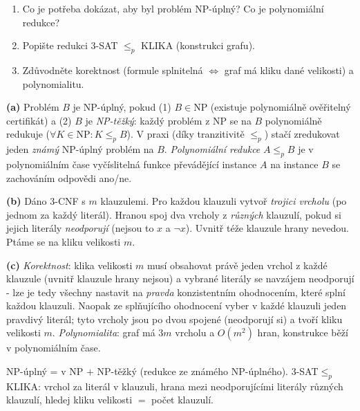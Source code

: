 \begin{zadani}
\begin{enumerate}[label=(\alph*)]
  \item {} Co je potřeba dokázat, aby byl problém NP-úplný? Co je polynomiální redukce?
  \item {} Popište redukci 3-SAT $\le_p$ KLIKA (konstrukci grafu).
  \item {} Zdůvodněte korektnost (formule splnitelná $\iff$ graf má kliku dané velikosti) a polynomialitu.
\end{enumerate}
\end{zadani}

\begin{reseni}
\textbf{(a)} Problém $B$ je NP-úplný, pokud (1) $B\in\mathrm{NP}$ (existuje polynomiálně ověřitelný certifikát) a (2) $B$ je \emph{NP-těžký}: každý problém z NP se na $B$ polynomiálně redukuje ($\forall K\in\mathrm{NP}:K\le_p B$). V praxi (díky tranzitivitě $\le_p$) stačí zredukovat jeden \emph{známý} NP-úplný problém na $B$. \emph{Polynomiální redukce} $A\le_p B$ je v polynomiálním čase vyčíslitelná funkce převádějící instance $A$ na instance $B$ se zachováním odpovědi ano/ne.

\textbf{(b)} Dáno 3-CNF s $m$ klauzulemi. Pro každou klauzuli vytvoř \emph{trojici vrcholu} (po jednom za každý literál). Hranou spoj dva vrcholy z \emph{různých} klauzulí, pokud si jejich literály \emph{neodporují} (nejsou to $x$ a $\neg x$). Uvnitř téže klauzule hrany nevedou. Ptáme se na kliku velikosti $m$.

\textbf{(c)} \emph{Korektnost}: klika velikosti $m$ musí obsahovat právě jeden vrchol z každé klauzule (uvnitř klauzule hrany nejsou) a vybrané literály se navzájem neodporují - lze je tedy všechny nastavit na \emph{pravda} konzistentním ohodnocením, které splní každou klauzuli. Naopak ze splňujícího ohodnocení vyber v každé klauzuli jeden pravdivý literál; tyto vrcholy jsou po dvou spojené (neodporují si) a tvoří kliku velikosti $m$. \emph{Polynomialita}: graf má $3m$ vrcholu a $O(m^2)$ hran, konstrukce běží v polynomiálním čase.
\end{reseni}

\begin{jadro}
NP-úplný = v NP $+$ NP-těžký (redukce ze známého NP-úplného). 3-SAT$\le_p$KLIKA: vrchol za literál v klauzuli, hrana mezi neodporujícími literály různých klauzulí, hledej kliku velikosti $=$ počet klauzulí.
\end{jadro}

